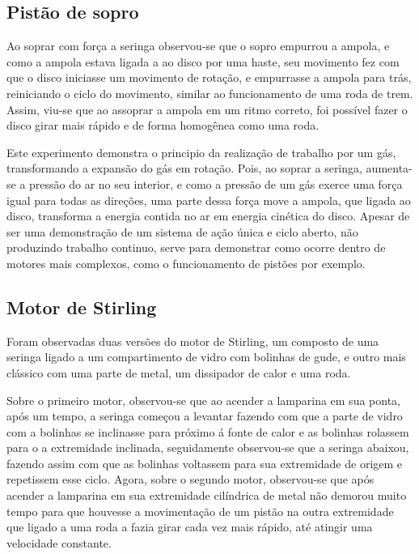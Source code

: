 \subsection{Pistão de sopro} %
Ao soprar com força a seringa observou-se que o sopro empurrou a ampola, e como a ampola estava ligada a ao disco por uma haste, seu movimento fez com que o disco iniciasse um movimento de rotação, e empurrasse a ampola para trás, reiniciando o ciclo do movimento, similar ao funcionamento de uma roda de trem. Assim, viu-se que ao assoprar a ampola em um ritmo correto, foi possível fazer o disco girar mais rápido e de forma homogênea como uma roda. 

Este experimento demonstra o principio da realização de trabalho por um gás, transformando a expansão do gás em rotação. Pois, ao soprar a seringa, aumenta-se a pressão do ar no seu interior, e como a pressão de um gás exerce uma força igual para todas as direções, uma parte dessa força move a ampola, que ligada ao disco, transforma a energia contida no ar em energia cinética do disco. Apesar de ser uma demonstração de um sistema de ação única e ciclo aberto, não produzindo trabalho continuo, serve para demonstrar como ocorre dentro de motores mais complexos, como o funcionamento de pistões por exemplo.

\subsection{Motor de Stirling} %
Foram observadas duas versões do motor de Stirling, um composto de uma seringa ligado a um compartimento de vidro com bolinhas de gude, e outro mais clássico com uma parte de metal, um dissipador de calor e uma roda.

Sobre o primeiro motor, observou-se que ao acender a lamparina em sua ponta, após um tempo, a seringa começou a levantar fazendo com que a parte de vidro com a bolinhas se inclinasse para próximo á fonte de calor e as bolinhas rolassem para o a extremidade inclinada, seguidamente observou-se que a seringa abaixou, fazendo assim com que as bolinhas voltassem para sua extremidade de origem e repetissem esse ciclo.
Agora, sobre o segundo motor, observou-se que após acender a lamparina em sua extremidade cilíndrica de metal não demorou muito tempo para que houvesse a movimentação de um pistão na outra extremidade que ligado a uma roda a fazia girar cada vez mais rápido, até atingir uma velocidade constante.


